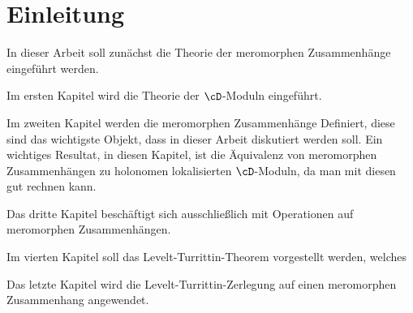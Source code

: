 \chapter{Einleitung}

\begin{comment}
Ziel der Arbeit
\end{comment}
In dieser Arbeit soll zunächst die Theorie der meromorphen Zusammenhänge
eingeführt werden.


\begin{comment}
Vorraussetzungen
\end{comment}

\begin{comment}
Aufbau / inhalt der Kapitel
\end{comment}
Im ersten Kapitel wird die Theorie der $\cD$-Moduln eingeführt.

Im zweiten Kapitel werden die meromorphen Zusammenhänge Definiert, diese sind
das wichtigste Objekt, dass in dieser Arbeit diskutiert werden soll.
Ein wichtiges Resultat, in diesen Kapitel, ist die Äquivalenz von meromorphen
Zusammenhängen zu holonomen lokalisierten $\cD$-Moduln, da man mit diesen gut
rechnen kann.

Das dritte Kapitel beschäftigt sich ausschließlich mit Operationen auf
meromorphen Zusammenhängen.

Im vierten Kapitel soll das Levelt-Turrittin-Theorem vorgestellt werden, 
welches

Das letzte Kapitel wird die Levelt-Turrittin-Zerlegung auf einen meromorphen
Zusammenhang angewendet.

\begin{comment}
    
\end{comment}

